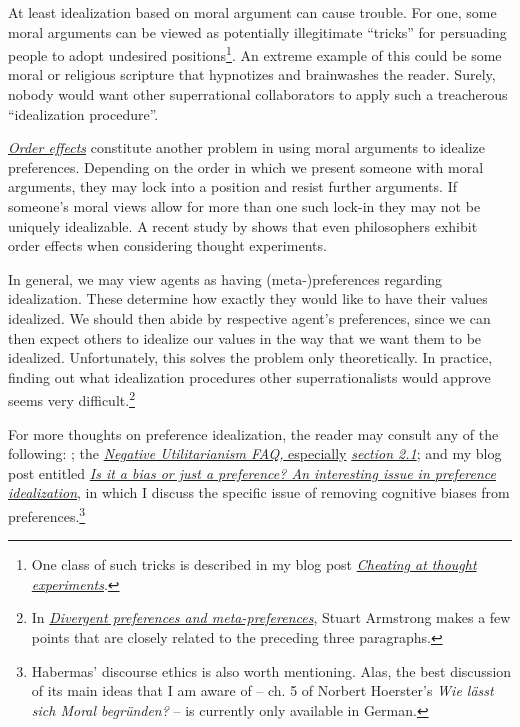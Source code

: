 At least idealization based on moral argument can cause trouble. For
one, some moral arguments can be viewed as potentially illegitimate
``tricks'' for persuading people to adopt undesired positions\footnote{One
  class of such tricks is described in my blog post
  \href{https://casparoesterheld.com/2015/12/06/cheating-at-thought-experiments/}{\emph{\emph{Cheating
  at thought experiments}}}.}. An extreme example of this could be some
moral or religious scripture that hypnotizes and brainwashes the reader.
Surely, nobody would want other superrational collaborators to apply
such a treacherous ``idealization procedure''.

\href{http://www.philosophyexperiments.com/sedan/Default5.aspx}{\emph{Order
effects}} constitute another problem in using moral arguments to
idealize preferences. Depending on the order in which we present someone
with moral arguments, they may lock into a position and resist further
arguments. If someone's moral views allow for more than one such lock-in
they may not be uniquely idealizable. A recent study by
\parencite{Schwitzgebel2012-vh} shows that even philosophers
exhibit order effects when considering thought experiments.

In general, we may view agents as having (meta-)preferences regarding
idealization. These determine how exactly they would like to have their
values idealized. We should then abide by respective agent's
preferences, since we can then expect others to idealize our values in
the way that we want them to be idealized. Unfortunately, this solves
the problem only theoretically. In practice, finding out what
idealization procedures other superrationalists would approve seems very
difficult.\footnote{In
  \href{https://agentfoundations.org/item?id=1492}{\emph{\emph{Divergent
  preferences and meta-preferences}}}, Stuart Armstrong makes a few
  points that are closely related to the preceding three paragraphs.}

For more thoughts on preference idealization, the reader may consult any
of the following:
\parencite{Yudkowsky2004-fz,Tomasik2016-cb,Grill2015-wk,Muehlhauser2012-ib};
the
\href{https://www.utilitarianism.com/nu/nufaq.html}{\emph{\emph{Negative
Utilitarianism FAQ,}} especially}
\href{https://www.utilitarianism.com/nu/nufaq.html\#2.1}{\emph{section
2.1}}; and my blog post entitled
\href{https://casparoesterheld.com/2017/01/18/is-it-a-bias-or-just-a-preference-an-interesting-issue-in-preference-idealization/}{\emph{\emph{Is
it a bias or just a preference? An interesting issue in preference
idealization}}}, in which I discuss the specific issue of removing
cognitive biases from preferences.\footnote{Habermas' discourse ethics
  is also worth mentioning. Alas, the best discussion of its main ideas
  that I am aware of -- ch. 5 of Norbert Hoerster's \emph{Wie lässt sich
  Moral begründen?} -- is currently only available in German.}


